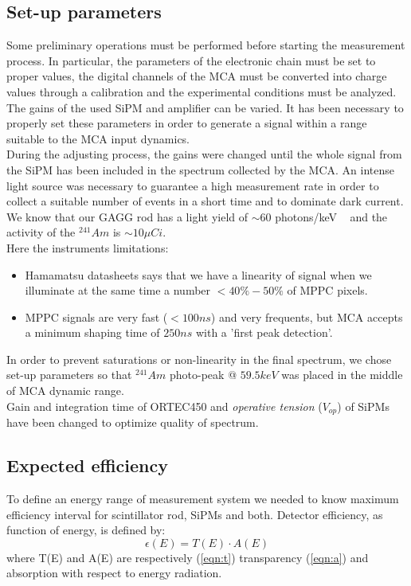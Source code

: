 \documentclass[10pt,a4paper, openany]{book}
\begin{document}
\subsection{Set-up parameters}
Some preliminary operations must be performed before starting the measurement process. In particular, the parameters of the electronic chain must be set to proper values, the digital channels of the MCA must be converted into charge values through a calibration and the experimental conditions must be analyzed.\\[2ex]
The gains of the used SiPM and amplifier can be varied. It has been necessary to properly set these parameters in order to generate a signal within a range suitable to the MCA input dynamics.\\
During the adjusting process, the gains were changed until the whole signal from the SiPM has been included in the spectrum collected by the MCA. An intense light source was necessary to guarantee a high measurement rate in order to collect a suitable number of events in a short time and to dominate dark current.\\
We know that our GAGG rod has a light yield of $\sim 60$ photons/keV ~\cite{gagg:1} and the activity of the $^{241}Am$ is $\sim 10\mu Ci$.\\[2ex]
Here the instruments limitations:
\begin{itemize}
\item Hamamatsu datasheets says that we have a linearity of signal when we illuminate at the same time a number $<40\%-50 \%$ of MPPC pixels.
\item MPPC signals are very fast ($<100ns$) and very frequents, but MCA accepts a minimum shaping time of $250ns$ with a 'first peak detection'.
\end{itemize}
In order to prevent saturations or non-linearity in the final spectrum, we chose set-up parameters so that $^{241}Am$ photo-peak @ $59.5 keV$ was placed in the middle of MCA dynamic range.\\
Gain and integration time of ORTEC450 and \emph{operative tension} ($V_{op}$) of SiPMs have been changed to optimize quality of spectrum.

\subsection{Expected efficiency}
To define an energy range of measurement system we needed to know maximum efficiency interval for scintillator rod, SiPMs and both.
Detector efficiency, as function of energy, is defined by:
\begin{equation}
\epsilon(E) = T(E)\cdot A(E)
\end{equation}
where T(E) and A(E) are respectively (\ref{eqn:t}) transparency (\ref{eqn:a}) and absorption with respect to energy radiation.
\end{document}
